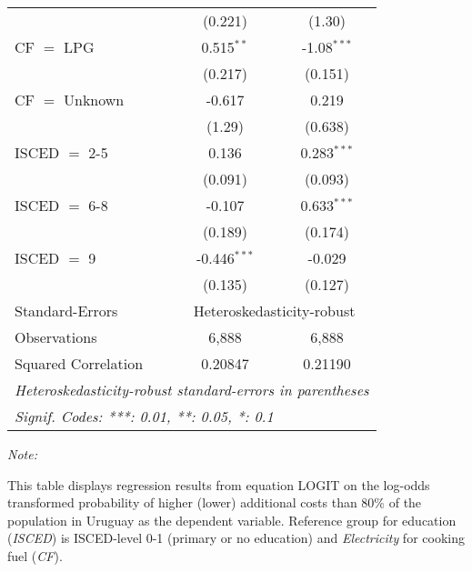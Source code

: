 \begin{table}[htbp!]
\begin{adjustbox}{width = 1\textwidth, max height = 0.95\textheight, center}
\begin{threeparttable}[b]
\begin{tabular}{lcc}
                                 & (0.221)        & (1.30)\\   
            CF $=$ LPG           & 0.515$^{**}$   & -1.08$^{***}$\\   
                                 & (0.217)        & (0.151)\\   
            CF $=$ Unknown       & -0.617         & 0.219\\   
                                 & (1.29)         & (0.638)\\   
            ISCED $=$ 2-5        & 0.136          & 0.283$^{***}$\\   
                                 & (0.091)        & (0.093)\\   
            ISCED $=$ 6-8        & -0.107         & 0.633$^{***}$\\   
                                 & (0.189)        & (0.174)\\   
            ISCED $=$ 9          & -0.446$^{***}$ & -0.029\\   
                                 & (0.135)        & (0.127)\\   
            \midrule 
            Standard-Errors & \multicolumn{2}{c}{Heteroskedasticity-robust} \\ 
            Observations         & 6,888          & 6,888\\  
            Squared Correlation  & 0.20847        & 0.21190\\  
            \midrule \midrule
            \multicolumn{3}{l}{\emph{Heteroskedasticity-robust standard-errors in parentheses}}\\
            \multicolumn{3}{l}{\emph{Signif. Codes: ***: 0.01, **: 0.05, *: 0.1}}\\
         \end{tabular}
         
         \begin{tablenotes}\item \medskip \textit{Note:}
            \item This table displays regression results from equation LOGIT on the log-odds transformed probability of higher (lower) additional costs than 80\% of the population in Uruguay as the dependent variable. Reference group for education (\textit{ISCED}) is ISCED-level 0-1 (primary or no education) and \textit{Electricity} for cooking fuel (\textit{CF}).
         \end{tablenotes}
      \end{threeparttable}
   \end{adjustbox}
\end{table}


